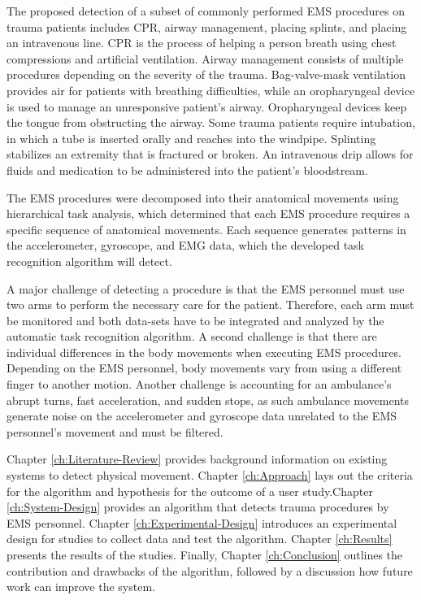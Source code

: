 \par The proposed detection of a subset of commonly performed EMS procedures on trauma patients includes \gls{CPR}, airway management, placing splints, and placing an intravenous line. CPR is the process of helping a person breath using chest compressions and artificial ventilation. Airway management consists of multiple procedures depending on the severity of the trauma. Bag-valve-mask ventilation provides air for patients with breathing difficulties, while an oropharyngeal device is used to manage an unresponsive patient's airway. Oropharyngeal devices keep the tongue from obstructing the airway. Some trauma patients require intubation, in which a tube is inserted orally and reaches into the windpipe. Splinting stabilizes an extremity that is fractured or broken. An intravenous drip allows for fluids and medication to be administered into the patient’s bloodstream.
\par The EMS procedures were decomposed into their anatomical movements using hierarchical task analysis, which determined that each EMS procedure requires a specific sequence of anatomical movements. Each sequence generates patterns in the accelerometer, gyroscope, and EMG data, which the developed task recognition algorithm will detect.
\par A major challenge of detecting a procedure is that the EMS personnel must use two arms to perform the necessary care for the patient. Therefore, each arm must be monitored and both data-sets have to be integrated and analyzed by the automatic task recognition algorithm. A second challenge is that there are individual differences in the body movements when executing EMS procedures. Depending on the EMS personnel, body movements vary from using a different finger to another motion. Another challenge is accounting for an ambulance's abrupt turns, fast acceleration, and sudden stops, as such ambulance movements generate noise on the accelerometer and gyroscope data unrelated to the EMS personnel's movement and must be filtered.
\par Chapter \ref{ch:Literature-Review} provides background information on existing systems to detect physical movement. Chapter \ref{ch:Approach} lays out the criteria for the algorithm and hypothesis for the outcome of a user study.Chapter \ref{ch:System-Design} provides an algorithm that detects trauma procedures by \gls{EMS} personnel. Chapter \ref{ch:Experimental-Design} introduces an experimental design for studies to collect data and test the algorithm. Chapter \ref{ch:Results} presents the results of the studies. Finally, Chapter \ref{ch:Conclusion} outlines the contribution and drawbacks of the algorithm, followed by a discussion how future work can improve the system. 